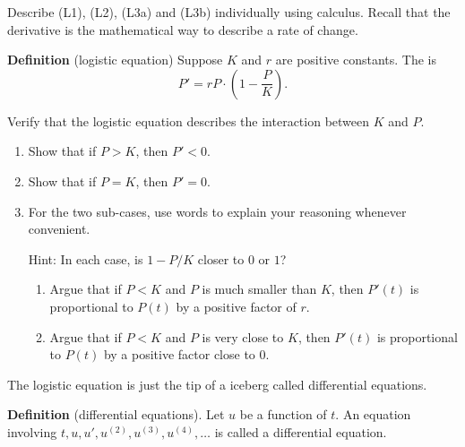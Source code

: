 \documentclass[../main.tex]{subfiles}
\begin{document}
Describe (L1), (L2), (L3a) and (L3b) individually using calculus. Recall that the derivative is the mathematical way to describe a rate of change. 

\begin{mdframed}[style=simple-compact] \label{def:logistic-eq}
  \textbf{Definition} (logistic equation)
  Suppose \(K\) and \(r\) are positive constants. The  is
  \begin{equation} \label{eq:logistic}
    P' = r P \cdot \left( 1 - \frac{P}{K} \right).
  \end{equation}
\end{mdframed}

\begin{example}
  Verify that the logistic equation describes the interaction between \(K\) and \(P\). 

  \begin{enumerate}[wide, label=(L\arabic*)]
    \item Show that if \(P > K\), then \(P' < 0\).
    \item Show that if \(P = K\), then \(P' = 0\).
    \item For the two sub-cases, use words to explain your reasoning whenever convenient. 

      Hint: In each case, is \(1 - P/K\) closer to \(0\) or \(1\)?
      \begin{enumerate}[wide]
        \item Argue that if \(P < K\) and \(P\) is much smaller than \(K\), then \(P'(t)\) is proportional to \(P(t)\) by a positive factor of \(r\). 
        \item Argue that if \(P < K\) and \(P\) is very close to \(K\), then \(P'(t)\) is proportional to \(P(t)\) by a positive factor close to \(0\).
      \end{enumerate}
  \end{enumerate}
\end{example}
\clearpage

The logistic equation is just the tip of a iceberg called differential equations.

\begin{mdframed}[style=simple-compact] \label{def:diff-eq}
  \textbf{Definition} (differential equations). Let \(u\) be a function of \(t\). An equation involving \(t,u, u', u^{(2)}, u^{(3)}, u^{(4)}, \ldots\) is called a differential equation.
\end{mdframed}
\end{document}
